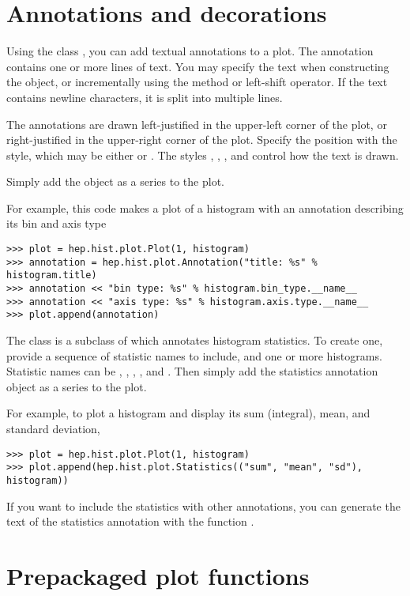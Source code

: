 
\section{Annotations and decorations}

Using the class , you can add textual
annotations to a plot.  The annotation contains one or more lines of
text.  You may specify the text when constructing the object, or
incrementally using the  method or left-shift operator.
If the text contains newline characters, it is split into multiple
lines.

The annotations are drawn left-justified in the upper-left corner of the
plot, or right-justified in the upper-right corner of the plot.  Specify
the position with the  style, which may be either
 or .  The styles ,
, , and
 control how the text is drawn.

Simply add the  object as a series to the plot.

For example, this code makes a plot of a histogram with an annotation
describing its bin and axis type
\begin{verbatim}
>>> plot = hep.hist.plot.Plot(1, histogram)
>>> annotation = hep.hist.plot.Annotation("title: %s" % histogram.title)
>>> annotation << "bin type: %s" % histogram.bin_type.__name__
>>> annotation << "axis type: %s" % histogram.axis.type.__name__
>>> plot.append(annotation)
\end{verbatim}

The class  is a subclass of
 which annotates histogram statistics.  To create one,
provide a sequence of statistic names to include, and one or more
histograms.  Statistic names can be , ,
, , and .  Then simply add
the statistics annotation object as a series to the plot.

For example, to plot a histogram and display its sum (integral), mean,
and standard deviation,
\begin{verbatim}
>>> plot = hep.hist.plot.Plot(1, histogram)
>>> plot.append(hep.hist.plot.Statistics(("sum", "mean", "sd"), histogram))
\end{verbatim}

If you want to include the statistics with other annotations, you can
generate the text of the statistics annotation with the function
.


\section{Prepackaged plot functions}
